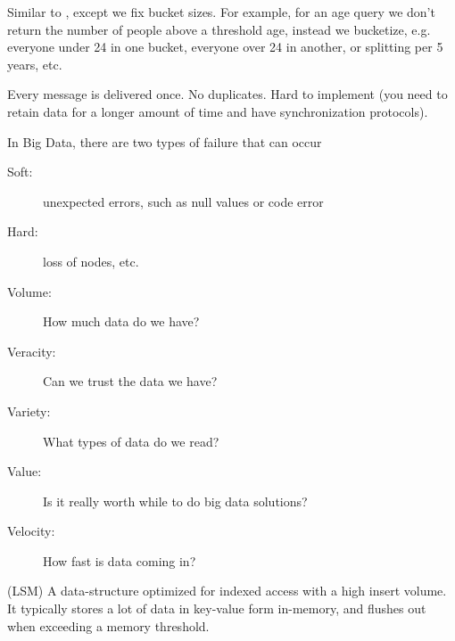 \begin{definition}
    Similar to , except we fix bucket sizes.
    For example, for an age query we don't return the number of people above a threshold age,
    instead we bucketize, e.g. everyone under 24 in one bucket, everyone over 24 in another,
    or splitting per 5 years, etc.
\end{definition}

\begin{definition}\label{def:exactlyonce}
    Every message is delivered once. No duplicates. Hard to implement (you need to retain data for a longer amount of time and have synchronization protocols).
\end{definition}

\begin{definition}
    In Big Data, there are two types of failure that can occur
    \begin{description}
        \item[Soft:] unexpected errors, such as null values or code error
        \item[Hard:] loss of nodes, etc.
    \end{description}
\end{definition}

\begin{definition}\label{def:fiveV}
    \begin{description}
        \item[Volume:] How much data do we have?
        \item[Veracity:] Can we trust the data we have?
        \item[Variety:] What types of data do we read?
        \item[Value:] Is it really worth while to do big data solutions?
        \item[Velocity:] How fast is data coming in?
    \end{description}
\end{definition}

\begin{definition}\label{def:LSM}
    (LSM) A data-structure optimized for indexed access with a high insert volume.
    It typically stores a lot of data in key-value form in-memory, and flushes out
    when exceeding a memory threshold.
\end{definition}

